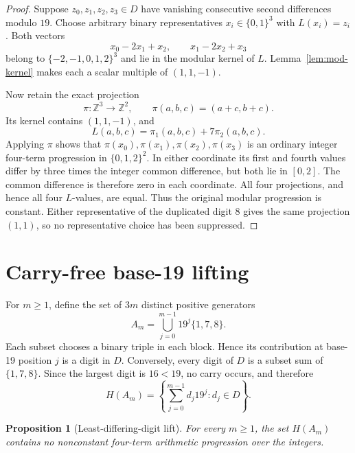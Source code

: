 \documentclass[11pt]{article}
\newtheorem{proposition}[theorem]{Proposition}
\theoremstyle{remark}
\newcommand{\Z}{\mathbb Z}
\begin{document}
\begin{proof}
Suppose $z_0,z_1,z_2,z_3\in D$ have vanishing consecutive second differences
modulo $19$.  Choose arbitrary binary representatives
$x_i\in\{0,1\}^3$ with $L(x_i)=z_i$.  Both vectors
\[
  x_0-2x_1+x_2,
  \qquad x_1-2x_2+x_3
\]
belong to $\{-2,-1,0,1,2\}^3$ and lie in the modular kernel of $L$.
Lemma~\ref{lem:mod-kernel} makes each a scalar multiple of $(1,1,-1)$.

Now retain the exact projection
\[
  \pi:\Z^3\longrightarrow\Z^2,
  \qquad \pi(a,b,c)=(a+c,b+c).
\]
Its kernel contains $(1,1,-1)$, and
\[
  L(a,b,c)=\pi_1(a,b,c)+7\pi_2(a,b,c).
\]
Applying $\pi$ shows that
$\pi(x_0),\pi(x_1),\pi(x_2),\pi(x_3)$ is an ordinary integer four-term
progression in $\{0,1,2\}^2$.  In either coordinate its first and fourth
values differ by three times the integer common difference, but both lie in
$[0,2]$.  The common difference is therefore zero in each coordinate.  All
four projections, and hence all four $L$-values, are equal.  Thus the original
modular progression is constant.  Either representative of the duplicated
digit $8$ gives the same projection $(1,1)$, so no representative choice has
been suppressed.
\end{proof}

\section{Carry-free base-19 lifting}

For $m\ge1$, define the set of $3m$ distinct positive generators
\[
  A_m=\bigcup_{j=0}^{m-1}19^j\{1,7,8\}.
\]
Each subset chooses a binary triple in each block.  Hence its contribution at
base-19 position $j$ is a digit in $D$.  Conversely, every digit of $D$ is a
subset sum of $\{1,7,8\}$.  Since the largest digit is $16<19$, no carry
occurs, and therefore
\begin{equation}\label{eq:language}
  H(A_m)=\left\{\sum_{j=0}^{m-1}d_j19^j:d_j\in D\right\}.
\end{equation}

\begin{proposition}[Least-differing-digit lift]\label{prop:lift}
For every $m\ge1$, the set $H(A_m)$ contains no nonconstant four-term
arithmetic progression over the integers.
\end{proposition}
\end{document}
